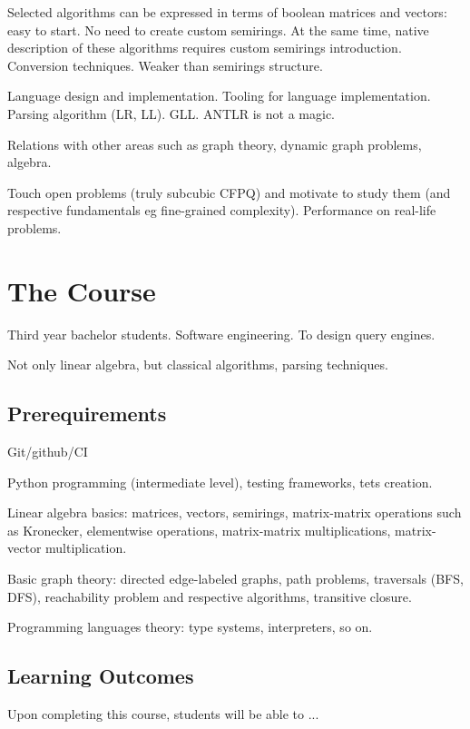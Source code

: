 \documentclass[sigconf]{acmart}
\begin{document}
Selected algorithms can be expressed in terms of boolean matrices and vectors: easy to start.
No need to create custom semirings.
At the same time, native description of these algorithms requires custom semirings introduction.
Conversion techniques.
Weaker than semirings structure. 

Language design and implementation. 
Tooling for language implementation.
Parsing algorithm (LR, LL).
GLL. 
ANTLR is not a magic. 

Relations with other areas such as graph theory, dynamic graph problems, algebra.

Touch open problems (truly subcubic CFPQ) and motivate to study them (and respective fundamentals eg fine-grained complexity).
Performance on real-life problems.

\section{The Course}

Third year bachelor students.
Software engineering. 
To design query engines.

Not only linear algebra, but classical algorithms, parsing techniques.


\subsection{Prerequirements}

Git/github/CI

Python programming (intermediate level), testing frameworks, tets creation. 

Linear algebra basics: matrices, vectors, semirings, matrix-matrix operations such as Kronecker, elementwise operations, matrix-matrix multiplications, matrix-vector multiplication.

Basic graph theory: directed edge-labeled graphs, path problems, traversals (BFS, DFS), reachability problem and respective algorithms, transitive closure.

Programming languages theory: type systems, interpreters, so on.

\subsection{Learning Outcomes}

Upon completing this course, students will be able to ...
\end{document}
